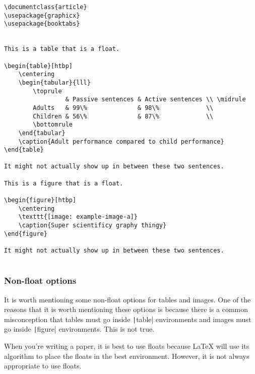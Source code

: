 \begin{listing}[htbp]
	\centering
	\begin{verbatim}
\documentclass{article}
\usepackage{graphicx}
\usepackage{booktabs}


This is a table that is a float.

\begin{table}[htbp]
    \centering
    \begin{tabular}{lll}
        \toprule
                 & Passive sentences & Active sentences \\ \midrule
        Adults   & 99\%              & 98\%             \\
        Children & 56\%              & 87\%             \\
        \bottomrule
    \end{tabular}
    \caption{Adult performance compared to child performance}
\end{table}

It might not actually show up in between these two sentences.

This is a figure that is a float.

\begin{figure}[htbp]
    \centering
    \texttt{[image: example-image-a]}
    \caption{Super scientificy graphy thingy}
\end{figure}

It might not actually show up in between these two sentences.


	\end{verbatim}
	\caption{Examples of floats in \LaTeX}
	\label{lst:float-examples}
\end{listing}

\subsubsection{Non-float options}
\label{subsubsec:non-float-options}

It is worth mentioning some non-float options for tables and images.
One of the reasons that it is worth mentioning these options is because there is a common misconception that tables must go inside \texttt|table| environments and images must go inside \texttt|figure| environments.
This is not true.

When you're writing a paper, it is best to use floats because \LaTeX{} will use its algorithm to place the floats in the best environment.
However, it is not always appropriate to use floats.


